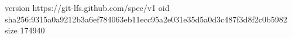 version https://git-lfs.github.com/spec/v1
oid sha256:9315a0a9212b3a6ef784063eb11ecc95a2e031e35d5a0d3c487f3d8f2c0b5982
size 174940
